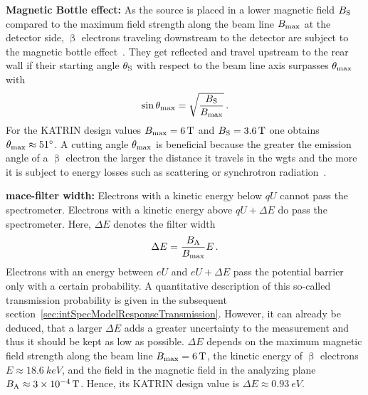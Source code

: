 {{\par \textbf{Magnetic Bottle effect:}
As the source is placed in a lower magnetic field $B_\mathrm{S}$ compared to the maximum field strength along the beam line $B_\mathrm{max}$ at the detector side, $\upbeta$ electrons traveling downstream to the detector are subject to the magnetic bottle effect~\cite{Angrik:2005ep}. They get reflected and travel upstream to the rear wall if their starting angle $\theta_\mathrm{S}$ with respect to the beam line axis surpasses $\theta_\mathrm{max}$ with
\begin{equation}
\label{eq:thetaMax}
\sin\theta_\mathrm{max} = \sqrt{\frac{B_\mathrm{S}}{B_\mathrm{max}}} 
\text{\,.}
\end{equation}
For the KATRIN design values $B_\mathrm{max}=\SI{6}{T}$ and $B_\mathrm{S}=\SI{3.6}{T}$ one obtains $\theta_\mathrm{max}\approx\SI{51}{\degree}$.
A cutting angle $\theta_\mathrm{max}$ is beneficial because the greater the emission angle of a $\upbeta$ electron the larger the distance it travels in the \gls{wgts} and the more it is subject to energy losses such as scattering or synchrotron radiation~\cite{Angrik:2005ep}.}

{\par \textbf{\gls{mace}-filter width:} 
Electrons with a kinetic energy below $qU$ cannot pass the spectrometer. Electrons with a kinetic energy above $qU+\Delta E$ do pass the spectrometer. Here, $\Delta E$ denotes the filter width \cite{Angrik:2005ep}
\begin{equation}
\label{eq:katrinExpSetupFilterWidth}
\Delta E = \frac{B_\mathrm{A}}{B_\mathrm{max}} E
\text{\,.}
\end{equation}
Electrons with an energy between $eU$ and $eU+\Delta E$ pass the potential barrier only with a certain probability. A quantitative description of this so-called transmission probability is given in the subsequent section~\ref{sec:intSpecModelResponseTransmission}. However, it can already be deduced, that a larger $\Delta E$ adds a greater uncertainty to the measurement and thus it should be kept as low as possible. $\Delta E$ depends on the maximum magnetic field strength along the beam line $B_\mathrm{max}=\SI{6}{T}$, the kinetic energy of $\upbeta$ electrons $E\approx\SI{18.6}{keV}$, and the field in the magnetic field in the analyzing plane $B_\mathrm{A}\approx\SI{3e-4}{T}$. Hence, its KATRIN design value is $\Delta E\approx\SI{0.93}{eV}$. }

}
